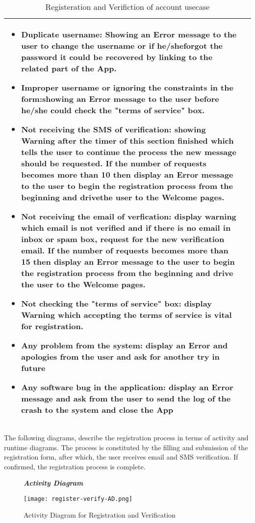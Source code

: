 \begin{table}[H]
\begin{tabulary}{\textwidth}{|J|J|}
\begin{minipage}[t]{0.6\textwidth}
\begin{itemize}
\item Duplicate username: Showing an Error message to the user to change the username or if he/sheforgot the password it could be recovered by linking to the related part of the App.
\item Improper username or ignoring the constraints in the form:showing an Error message to the user before he/she could check the "terms of service" box.
\item Not receiving the SMS of verification: showing Warning after the timer of this section finished which tells the user to continue the process the new message should be requested. If the number of requests becomes more than 10 then display an Error message to the user to begin the registration process from the beginning and drivethe user to the Welcome pages.
\item Not receiving the email of verfication: display warning which email is not verified and if there is no email in inbox or spam box, request for the new verification email. If the number of requests becomes more than 15 then display an Error message to the user to begin the registration process from the beginning and drive the user to the Welcome pages.
\item Not checking the "terms of service" box: display Warning which accepting the terms of service is vital for registration.
\item Any problem from the system: display an Error and apologies from the user and ask for another try in future
\item Any software bug in the application: display an Error message and ask from the user to send the log of the crash to the system and close the App
\end{itemize}
\end{minipage}\\
\hline
\end{tabulary}
\caption{\label{tab:Register-Verify-account}Registeration and Verifiction of account usecase}
\end{table}

The following diagrams, describe the registration process in terms of activity and runtime diagrams. The process is constituted by the filling and submission of the registration form, after which, the user receives email and SMS verification. If confirmed, the registration process is complete.

\begin{figure}[H]
\begin{flushleft}\emph{\textbf{Activity Diagram}}\end{flushleft}
\caption{Activity Diagram for Registration and Verification}
\label{register-verify-AD}
\centering
\texttt{[image: register-verify-AD.png]}
\end{figure}

